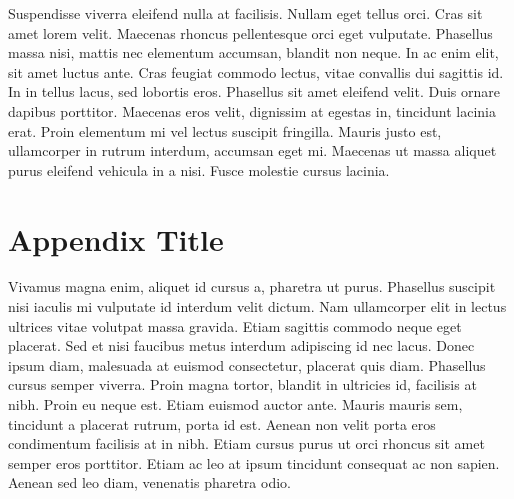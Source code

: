 \documentclass[draft, grl]{agutex}
\begin{document}
\begin{article}
Suspendisse viverra eleifend nulla at facilisis. Nullam eget tellus orci. Cras sit amet lorem velit. Maecenas rhoncus pellentesque orci eget vulputate. Phasellus massa nisi, mattis nec elementum accumsan, blandit non neque. In ac enim elit, sit amet luctus ante. Cras feugiat commodo lectus, vitae convallis dui sagittis id. In in tellus lacus, sed lobortis eros. Phasellus sit amet eleifend velit. Duis ornare dapibus porttitor. Maecenas eros velit, dignissim at egestas in, tincidunt lacinia erat. Proin elementum mi vel lectus suscipit fringilla. Mauris justo est, ullamcorper in rutrum interdum, accumsan eget mi. Maecenas ut massa aliquet purus eleifend vehicula in a nisi. Fusce molestie cursus lacinia.





\appendix

\section{Appendix Title}

Vivamus magna enim, aliquet id cursus a, pharetra ut purus. Phasellus suscipit nisi iaculis mi vulputate id interdum velit dictum. Nam ullamcorper elit in lectus ultrices vitae volutpat massa gravida. Etiam sagittis commodo neque eget placerat. Sed et nisi faucibus metus interdum adipiscing id nec lacus. Donec ipsum diam, malesuada at euismod consectetur, placerat quis diam. Phasellus cursus semper viverra. Proin magna tortor, blandit in ultricies id, facilisis at nibh. Proin eu neque est. Etiam euismod auctor ante. Mauris mauris sem, tincidunt a placerat rutrum, porta id est. Aenean non velit porta eros condimentum facilisis at in nibh. Etiam cursus purus ut orci rhoncus sit amet semper eros porttitor. Etiam ac leo at ipsum tincidunt consequat ac non sapien. Aenean sed leo diam, venenatis pharetra odio.


\end{article}
\end{document}
